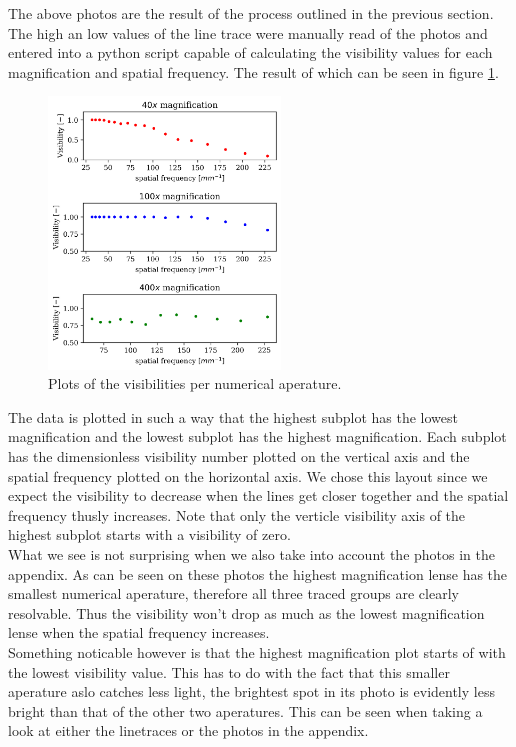 The above photos are the result of the process outlined in the previous section. The high an low values of the line trace were manually read of the photos and entered into a python script capable of calculating the visibility values for each magnification and spatial frequency. The result of which can be seen in figure \ref{fig:visibilities}.\\

\begin{figure}
    \centering
    \vspace{-3mm}
    \includegraphics[width=0.55\textwidth,keepaspectratio]{afbeeldingen/visibilities.png}
    \caption{Plots of the visibilities per numerical aperature.}
    \label{fig:visibilities}
    \vspace{0mm}
\end{figure}

\vspace{-7mm}
The data is plotted in such a way that the highest subplot has the lowest magnification and the lowest subplot has the highest magnification. Each subplot has the dimensionless visibility number plotted on the vertical axis and the spatial frequency plotted on the horizontal axis. We chose this layout since we expect the visibility to decrease when the lines get closer together and the spatial frequency thusly increases. Note that only the verticle visibility axis of the highest subplot starts with a visibility of zero.\\
What we see is not surprising when we also take into account the photos in the appendix. As can be seen on these photos the highest magnification lense has the smallest numerical aperature, therefore all three traced groups are clearly resolvable. Thus the visibility won't drop as much as the lowest magnification lense when the spatial frequency increases.\\
Something noticable however is that the highest magnification plot starts of with the lowest visibility value. This has to do with the fact that this smaller aperature aslo catches less light, the brightest spot in its photo is evidently less bright than that of the other two aperatures. This can be seen when taking a look at either the linetraces or the photos in the appendix.


